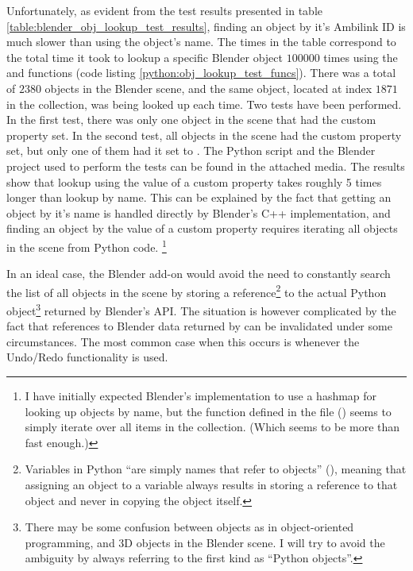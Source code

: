 Unfortunately, as evident from the test results presented in table \ref{table:blender_obj_lookup_test_results}, 
finding an object by it's Ambilink ID is much slower than using the object's name.
The times in the table correspond to the total time it took to lookup a specific Blender object $100000$ times 
using the  and  functions (code listing \ref{python:obj_lookup_test_funcs}).
There was a total of $2380$ objects in the Blender scene, and the same object,
located at index $1871$ in the  collection, was being looked up each time.
Two tests have been performed. In the first test, there was only one object in the scene that had the custom property set.
In the second test, all objects in the scene had the custom property set, but only one of them had it set to .
The Python script and the Blender project used to perform the tests can be found in the attached media.
The results show that lookup using the value of a custom property takes roughly 5 times longer
than lookup by name. This can be explained by the fact that getting an object by it's name is handled 
directly by Blender's C++ implementation, and finding an object
by the value of a custom property requires iterating all objects in the scene from Python code.
\footnote{I have initially expected Blender's implementation to use a hashmap for looking up objects by name,
but the  
function defined in the  file (\cite{blender_git_rna_lookup_string})
seems to simply iterate over all items in the collection. (Which seems to be more than fast enough.)}

In an ideal case, the Blender add-on would avoid the need to constantly search the list of all objects
in the scene by storing a reference\footnote{
Variables in Python ``are simply names that refer to objects'' (\cite{python_docs_references}), meaning that 
assigning an object to a variable always results in storing a reference to that object and never in copying the object itself.
} to the actual Python object\footnote{
    There may be some confusion between objects as in object-oriented programming, and 3D objects in the Blender scene.
    I will try to avoid the ambiguity by always referring to the first kind as ``Python objects''.
} returned by Blender's API.
The situation is however complicated by the fact that references to Blender data 
returned by  can be invalidated under some circumstances.
The most common case when this occurs is whenever the Undo/Redo functionality is used.

